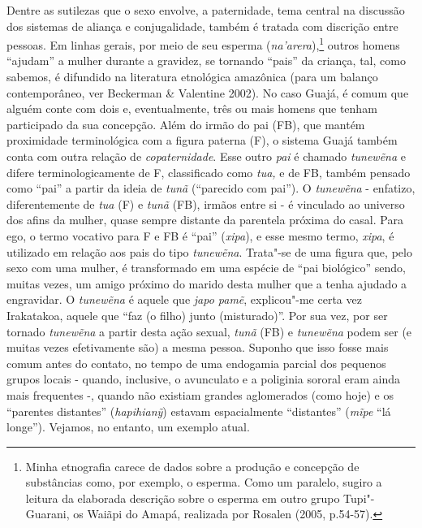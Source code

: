 Dentre as sutilezas que o sexo envolve, a paternidade, tema central na
discussão dos sistemas de aliança e conjugalidade, também é tratada com
discrição entre pessoas. Em linhas gerais, por meio de seu esperma
(\emph{na'arera}),\footnote{Minha etnografia carece de dados sobre a
  produção e concepção de substâncias como, por exemplo, o esperma. Como
  um paralelo, sugiro a leitura da elaborada descrição sobre o esperma
  em outro grupo Tupi"-Guarani, os Waiãpi do Amapá, realizada por Rosalen
  (2005, p.54-57).} outros homens ``ajudam'' a mulher durante a
gravidez, se tornando ``pais'' da criança, tal, como sabemos, é
difundido na literatura etnológica amazônica (para um balanço
contemporâneo, ver Beckerman \& Valentine 2002). No caso Guajá, é comum
que alguém conte com dois e, eventualmente, três ou mais homens que
tenham participado da sua concepção. Além do irmão do pai (FB), que
mantém proximidade terminológica com a figura paterna (F), o sistema
Guajá também conta com outra relação de \emph{copaternidade}. Esse outro
\emph{pai} é chamado \emph{tunewẽna} e difere terminologicamente de F,
classificado como \emph{tua,} e de FB, também pensado como ``pai'' a
partir da ideia de \emph{tunã} (``parecido com pai''). O \emph{tunewẽna}
- enfatizo, diferentemente de \emph{tua} (F) e \emph{tunã} (FB), irmãos
entre si - é vinculado ao universo dos afins da mulher, quase sempre
distante da parentela próxima do casal. Para ego, o termo vocativo para
F e FB é ``pai'' (\emph{xipa}), e esse mesmo termo, \emph{xipa}, é
utilizado em relação aos pais do tipo \emph{tunewẽna}. Trata"-se de uma
figura que, pelo sexo com uma mulher, é transformado em uma espécie de
``pai biológico'' sendo, muitas vezes, um amigo próximo do marido desta
mulher que a tenha ajudado a engravidar. O \emph{tunewẽna} é aquele que
\emph{japo pamẽ}, explicou"-me certa vez Irakatakoa, aquele que ``faz (o
filho) junto (misturado)''. Por sua vez, por ser tornado \emph{tunewẽna}
a partir desta ação sexual, \emph{tunã} (FB) e \emph{tunewẽna} podem ser
(e muitas vezes efetivamente são) a mesma pessoa. Suponho que isso fosse
mais comum antes do contato, no tempo de uma endogamia parcial dos
pequenos grupos locais - quando, inclusive, o avunculato e a poliginia
sororal eram ainda mais frequentes -, quando não existiam grandes
aglomerados (como hoje) e os ``parentes distantes'' (\emph{hapihianỹ})
estavam espacialmente ``distantes'' (\emph{mĩpe} ``lá longe''). Vejamos,
no entanto, um exemplo atual.

